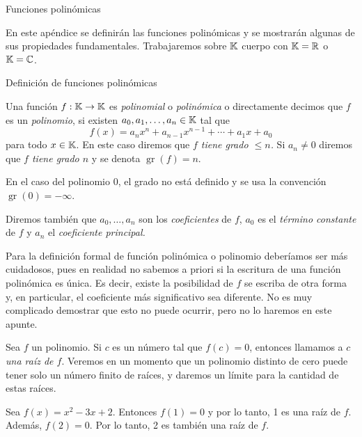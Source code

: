\begin{chapter}{Funciones polinómicas}

 En este apéndice se definirán las funciones polinómicas y se mostrarán algunas de sus propiedades fundamentales. Trabajaremos sobre $\mathbb K$  cuerpo con $\mathbb K=\mathbb R$ o $\mathbb K=\mathbb C$.

 \begin{section}{Definición de funciones polinómicas}\label{seccion-definicion-polinomios}


  \begin{definicion}
      Una función $f: \mathbb K \to \mathbb K$ es \textit{polinomial} o \textit{polinómica} o directamente decimos que $f$  es  un \textit{polinomio}, si existen $a_0,a_1,\ldots,a_n \in \mathbb K$ tal que
      \begin{equation}\label{eq-funcion-polinomica}
          f(x) = a_nx^n + a_{n-1}x^{n-1}+\cdots + a_1x +a_0
      \end{equation}
      para todo $x \in \mathbb K$. En este caso  diremos que  \textit{$f$ tiene grado $\le n$.} Si $a_n \ne 0$ diremos que \textit{$f$ tiene grado $n$} y  se denota $\operatorname{gr}(f)=n$.

      En  el caso del polinomio $0$, el grado no está definido y se usa la convención $\operatorname{gr}(0)=-\infty$.

      Diremos también que  $a_0,\ldots,a_n$ son los \textit{coeficientes} de $f$, $a_0$ es el \textit{término constante} de $f$ y $a_n$  el \textit{coeficiente principal.}
  \end{definicion}

  \begin{obs}
      Para la definición formal de función polinómica o polinomio deberíamos ser más cuidadosos, pues en realidad no sabemos a priori si la escritura de una función polinómica es única. Es  decir,  existe la posibilidad de $f$  se escriba de otra forma y,  en particular, el coeficiente más significativo sea diferente. No es muy complicado demostrar que esto no puede ocurrir, pero no lo haremos en este apunte.
  \end{obs}


  Sea $f$ un polinomio. Si $c$ es un número tal que $f (c) = 0$, entonces llamamos a \textit{$c$ una raíz de $f$}. Veremos en un momento que un polinomio distinto de cero puede tener solo un número finito de raíces, y daremos un límite para la cantidad de estas raíces.

  \begin{ejemplo*}
      Sea $f (x) = x^2 - 3x + 2$. Entonces $f(1)=0$ y por lo tanto, 1 es una raíz de $f$.
      Además, $f (2) = 0$. Por lo tanto, 2 es también una raíz de $f$.
  \end{ejemplo*}


\end{section}
\end{chapter}
